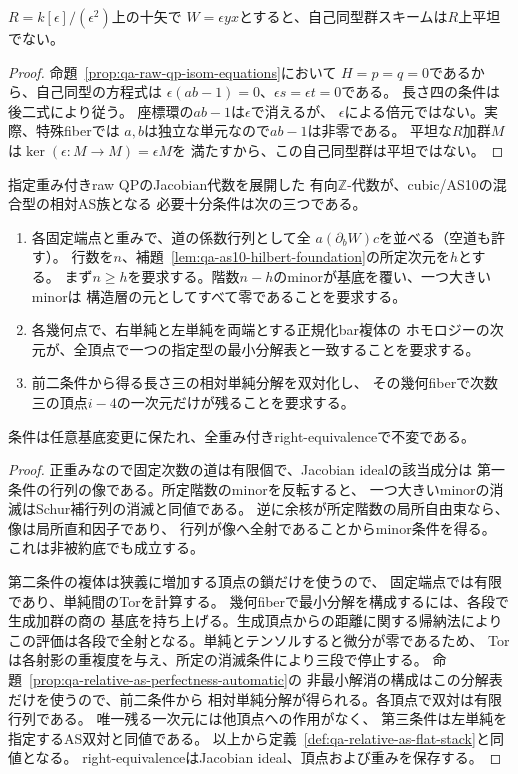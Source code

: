 \begin{corollary}[raw安定化群の非平坦な例]
\label{cor:qa-raw-nilpotent-nonflat-stabilizer}
$R=k[\epsilon]/(\epsilon^2)$上の十矢で
$W=\epsilon yx$とすると、自己同型群スキームは$R$上平坦でない。
\end{corollary}
\begin{proof}
命題~\ref{prop:qa-raw-qp-isom-equations}において
$H=p=q=0$であるから、自己同型の方程式は
$\epsilon(ab-1)=0$、$\epsilon s=\epsilon t=0$である。
長さ四の条件は後二式により従う。
座標環の$ab-1$は$\epsilon$で消えるが、
$\epsilon$による倍元ではない。実際、特殊fiberでは
$a,b$は独立な単元なので$ab-1$は非零である。
平坦な$R$加群$M$は$\ker(\epsilon:M\to M)=\epsilon M$を
満たすから、この自己同型群は平坦ではない。
\end{proof}

\begin{proposition}[AS適合性の次数別行列判定]
\label{prop:qa-qp-as-matrix-recognition}
指定重み付きraw QPのJacobian代数を展開した
有向$\mathbb Z$-代数が、cubic/AS10の混合型の相対AS族となる
必要十分条件は次の三つである。
\begin{enumerate}
\item 各固定端点と重みで、道の係数行列として全
$a(\partial_b W)c$を並べる（空道も許す）。
行数を$n$、補題~\ref{lem:qa-as10-hilbert-foundation}の所定次元を$h$とする。
まず$n\ge h$を要求する。階数$n-h$のminorが基底を覆い、一つ大きいminorは
構造層の元としてすべて零であることを要求する。
\item 各幾何点で、右単純と左単純を両端とする正規化bar複体の
ホモロジーの次元が、全頂点で一つの指定型の最小分解表と一致することを要求する。
\item 前二条件から得る長さ三の相対単純分解を双対化し、
その幾何fiberで次数三の頂点$i-4$の一次元だけが残ることを要求する。
\end{enumerate}
条件は任意基底変更に保たれ、全重み付きright-equivalenceで不変である。
\end{proposition}
\begin{proof}
正重みなので固定次数の道は有限個で、Jacobian idealの該当成分は
第一条件の行列の像である。所定階数のminorを反転すると、
一つ大きいminorの消滅はSchur補行列の消滅と同値である。
逆に余核が所定階数の局所自由束なら、像は局所直和因子であり、
行列が像へ全射であることからminor条件を得る。
これは非被約底でも成立する。

第二条件の複体は狭義に増加する頂点の鎖だけを使うので、
固定端点では有限であり、単純間のTorを計算する。
幾何fiberで最小分解を構成するには、各段で生成加群の商の
基底を持ち上げる。生成頂点からの距離に関する帰納法により
この評価は各段で全射となる。単純とテンソルすると微分が零であるため、
Torは各射影の重複度を与え、所定の消滅条件により三段で停止する。
命題~\ref{prop:qa-relative-as-perfectness-automatic}の
非最小解消の構成はこの分解表だけを使うので、前二条件から
相対単純分解が得られる。各頂点で双対は有限行列である。
唯一残る一次元には他頂点への作用がなく、
第三条件は左単純を指定するAS双対と同値である。
以上から定義~\ref{def:qa-relative-as-flat-stack}と同値となる。
right-equivalenceはJacobian ideal、頂点および重みを保存する。
\end{proof}

